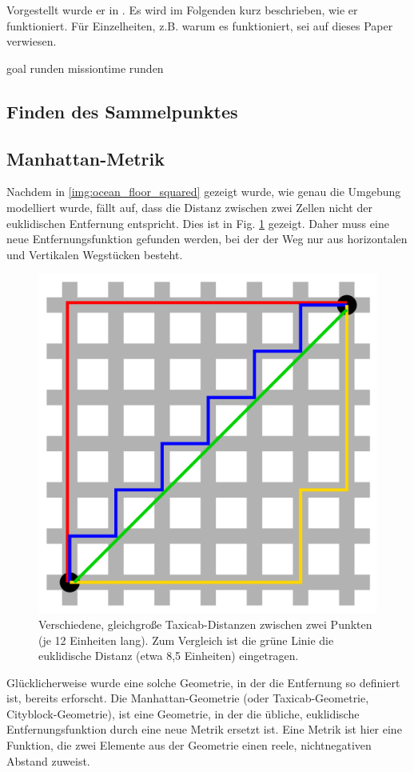 \documentclass{article}
\begin{document}
Vorgestellt wurde er in \cite{welzl91}. Es wird im Folgenden kurz beschrieben, wie er funktioniert. Für Einzelheiten, z.B. warum es funktioniert,
sei auf dieses Paper verwiesen.


goal runden
missiontime runden

\subsection{Finden des Sammelpunktes}

\subsection{Manhattan-Metrik}
\label{sec:manhattan}

Nachdem in \ref{img:ocean_floor_squared} gezeigt wurde, wie genau die Umgebung
modelliert wurde, fällt auf, dass die Distanz zwischen zwei Zellen nicht der euklidischen Entfernung
entspricht. Dies ist in Fig. \ref{img:taxicab_euclid} gezeigt. Daher muss eine neue Entfernungsfunktion 
gefunden werden, bei der der Weg nur aus horizontalen und Vertikalen Wegstücken besteht.

\begin{figure}[!ht]
  \centering
  \includegraphics[width=.45\textwidth]{img/taxicab_distance.png}
  \caption{Verschiedene, gleichgroße Taxicab-Distanzen zwischen zwei Punkten (je 12 Einheiten lang). 
  Zum  Vergleich ist die grüne Linie die euklidische Distanz (etwa 8,5 Einheiten) eingetragen. \cite{wikicity}}
  \label{img:taxicab_euclid}
\end{figure}

Glücklicherweise wurde eine solche Geometrie, in der die Entfernung so definiert ist, bereits erforscht.
Die Manhattan-Geometrie (oder Taxicab-Geometrie, Cityblock-Geometrie), ist eine Geometrie, in der
die übliche, euklidische Entfernungsfunktion durch eine neue Metrik ersetzt ist. Eine Metrik ist hier
eine Funktion, die zwei Elemente aus der Geometrie einen reele, nichtnegativen Abstand zuweist.
\end{document}
